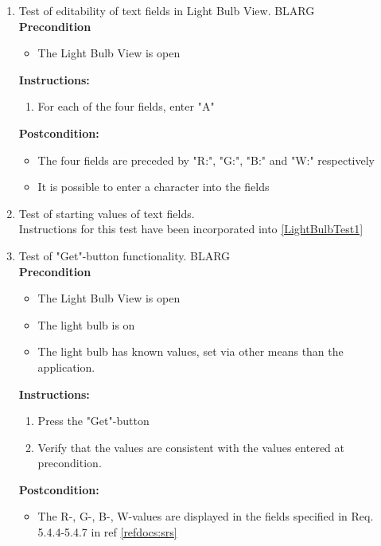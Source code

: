 \documentclass[a4paper]{article}
\newlength{\testlabellength}
\newenvironment{testlist}{\begin{enumerate}[label=\bfseries Instruction \thesubsection.\arabic* , labelindent=0pt, labelwidth=\testlabellength , leftmargin=2cm]}{\end{enumerate}}
\newenvironment{precondition}{
{\color{white}BLARG}\\ 
\textbf{Precondition}
\begin{itemize}[labelindent=0cm, labelwidth=2cm , leftmargin=1cm]
}
{\end{itemize}}
\newenvironment{instruction}{
\textbf{Instructions:}
\begin{enumerate}[label=\bfseries  \arabic*., labelindent=0cm, labelwidth=2cm , leftmargin=1cm]
}
{\end{enumerate}}
\newenvironment{postcondition}{
\textbf{Postcondition:}
\begin{itemize}[labelindent=0cm, labelwidth=2cm , leftmargin=1cm]
}
{\end{itemize}}
\begin{document}
\begin{appendices}
\begin{testlist}
   
   	\item Test of editability of text fields in Light Bulb View.
   		\begin{precondition}
   			\item The Light Bulb View is open
		\end{precondition}
    	\begin{instruction}
    		\item For each of the four fields, enter "A"
    	\end{instruction}
    	\begin{postcondition}
    		\item The four fields are preceded by "R:", "G:", "B:" and "W:" respectively
    		\item It is possible to enter a character into the fields
    	\end{postcondition}


	\item Test of starting values of text fields.\\
		Instructions for this test have been incorporated into \ref{LightBulbTest1}  

	\item Test of "Get"-button functionality.
		\begin{precondition}
			\item The Light Bulb View is open
			\item The light bulb is on
			\item The light bulb has known values, set via other means than the application.
		\end{precondition}
		\begin{instruction}
			\item Press the "Get"-button
			\item Verify that the values are consistent with the values entered at precondition.
		\end{instruction}
		\begin{postcondition}
			\item The R-, G-, B-, W-values are displayed in the fields specified in Req. 5.4.4-5.4.7 in ref \ref{refdocs:srs}
		\end{postcondition}


\end{testlist}
\end{appendices}
\end{document}
